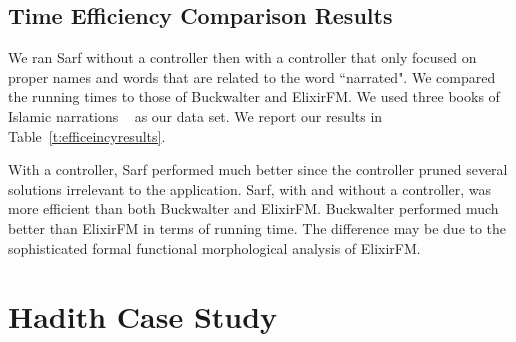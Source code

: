 \documentclass[a4,12pt]{report}
\begin{document}
\subsection{Time Efficiency Comparison Results}
\label{sec:timeefficiency}

\begin{table}[tb]
\centering
\caption{Results of Sarf, Buckwalter and ElixirFM.}
\normalsize
\label{t:efficeincyresults}
\end{table}

We ran Sarf without a controller then with a controller that only 
focused on proper names and words that are related to the word ``narrated".
We compared the running times to those of Buckwalter and ElixirFM.
We used three books of Islamic narrations  ~\cite{IbnHanbal,AlTousi,AlKulayni} as our data set.
We report our results in Table~\ref{t:efficeincyresults}.

With a controller, Sarf performed much better since the controller pruned several solutions irrelevant to the application. 
Sarf, with and without a controller, was more efficient than both Buckwalter and ElixirFM. 
Buckwalter performed much better than ElixirFM in 
terms of running time. 
The difference may be due to the sophisticated formal 
functional morphological analysis of ElixirFM. 

\section{Hadith Case Study}
\label{sec:hadith}
\end{document}

